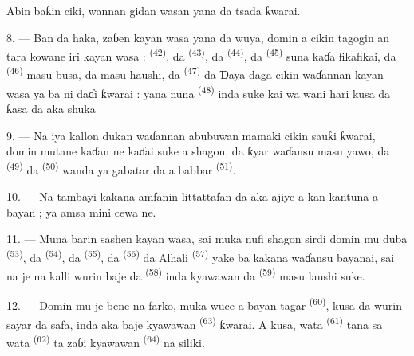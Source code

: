 Abin baƙin ciki, wannan gidan wasan yana da tsada ƙwarai.

8. --- Ban da haka, zaɓen kayan wasa yana da wuya, domin a cikin
tagogin an tara kowane iri kayan wasa : 
\textsuperscript{(42)}, da  \textsuperscript{(43)}, da
 \textsuperscript{(44)}, da  \textsuperscript{(45)} suna
kaɗa fikafikai, da  \textsuperscript{(46)} masu busa, da
 masu haushi, da 
\textsuperscript{(47)} da  Ɗaya daga cikin
waɗannan kayan wasa ya ba ni daɗi ƙwarai : yana nuna  \textsuperscript{(48)} inda  suke
kai wa wani  hari kusa da ƙasa da aka shuka


9. --- Na iya kallon dukan waɗannan abubuwan mamaki cikin sauƙi ƙwarai,
domin mutane kaɗan ne kaɗai suke a shagon, da ƙyar waɗansu masu yawo,
da  \textsuperscript{(49)} da 
\textsuperscript{(50)} wanda ya gabatar da  a babbar
 \textsuperscript{(51)}.

10. --- Na tambayi kakana amfanin littattafan da aka ajiye a kan
kantuna a bayan  ; ya amsa mini cewa
 ne.

\VUsaut{3.6mm}
\VUsaut{2.8mm}

11. --- Muna barin sashen kayan wasa, sai muka nufi shagon sirdi domin
mu duba  \textsuperscript{(53)}, da 
\textsuperscript{(54)}, da  \textsuperscript{(55)}, da
 \textsuperscript{(56)} da  Alhali
 \textsuperscript{(57)} yake ba kakana waɗansu bayanai,
sai na je na kalli wurin baje  da
 \textsuperscript{(58)} inda kyawawan  da
 \textsuperscript{(59)} masu laushi suke.

12. --- Domin mu je bene na farko, muka wuce a bayan tagar
 \textsuperscript{(60)}, kusa da wurin sayar da safa,
inda aka baje kyawawan  \textsuperscript{(63)} ƙwarai. A kusa,
wata  \textsuperscript{(61)} tana sa wata  \textsuperscript{(62)} ta zaɓi kyawawan 
\textsuperscript{(64)} na siliki.

